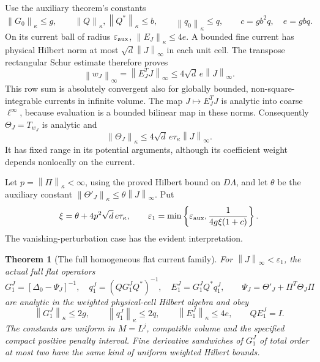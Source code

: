 \documentclass[11pt]{article}
\newtheorem{theorem}{Theorem}
\theoremstyle{remark}\newtheorem{remark}[theorem]{Remark}
\newcommand{\norm}[1]{\left\lVert#1\right\rVert}
\begin{document}
Use the auxiliary theorem's constants
\[
 \norm{G_0}_\kappa\le g,\qquad
 \norm{Q}_\kappa,\norm{Q^*}_\kappa\le b,\qquad
 \norm{q_0}_\kappa\le q,
 \qquad c=gb^2q,\quad e=gbq.
\]
On its current ball of radius $\varepsilon_{\rm aux}$,
$\norm{E_J}_\kappa\le4e$. A bounded fine current has physical
Hilbert norm at most $\sqrt d\norm{J}_\infty$ in each unit cell.
The transpose rectangular Schur estimate therefore proves
\begin{equation}
 \norm{w_J}_\infty=\norm{E_J^TJ}_\infty
       \le4\sqrt d\,e\norm{J}_\infty.
 \label{fc-weight-bound}
\end{equation}
This row sum is absolutely convergent also for globally bounded,
non-square-integrable currents in infinite volume.
The map $J\mapsto E_J^TJ$ is analytic into coarse
$\ell^\infty$, because evaluation is a bounded bilinear map in
these norms. Consequently $\Theta_J=T_{w_J}$ is analytic and
\begin{equation}
 \norm{\Theta_J}_\kappa
       \le4\sqrt d\,e\tau_\kappa\norm{J}_\infty.
 \label{fc-Theta-bound}
\end{equation}
It has fixed range in its potential arguments, although its
coefficient weight depends nonlocally on the current.

Let $p=\norm{\Pi}_\kappa<\infty$, using the proved Hilbert bound
on $D\Lambda$, and let $\theta$ be the auxiliary constant
$\norm{\Theta'_J}_\kappa\le\theta\norm{J}_\infty$. Put
\begin{equation}
 \xi=\theta+4p^2\sqrt d\,e\tau_\kappa,
 \qquad
 \varepsilon_1=\min\left\{\varepsilon_{\rm aux},
              \frac1{4g\xi(1+c)}\right\}.
 \label{fc-full-radius}
\end{equation}
The vanishing-perturbation case has the evident interpretation.

\begin{theorem}[The full homogeneous flat current family]
\label{fc-full-family-theorem}
For $\norm{J}_\infty<\varepsilon_1$, the actual full flat operators
\begin{equation}
 G_1^J=[\Delta_0-\Psi_J]^{-1},\quad
 q_1^J=(QG_1^JQ^*)^{-1},\quad E_1^J=G_1^JQ^*q_1^J,
 \qquad \Psi_J=\Theta'_J+\Pi^T\Theta_J\Pi
 \label{fc-full-family}
\end{equation}
are analytic in the weighted physical-cell Hilbert algebra and obey
\begin{equation}
 \norm{G_1^J}_\kappa\le2g,\qquad
 \norm{q_1^J}_\kappa\le2q,\qquad
 \norm{E_1^J}_\kappa\le4e,
 \qquad QE_1^J=I.
 \label{fc-full-family-bounds}
\end{equation}
The constants are uniform in $M=L^j$, compatible volume and the
specified compact positive penalty interval. Fine derivative
sandwiches of $G_1^J$ of total order at most two have the same kind
of uniform weighted Hilbert bounds.
\end{theorem}
\end{document}
